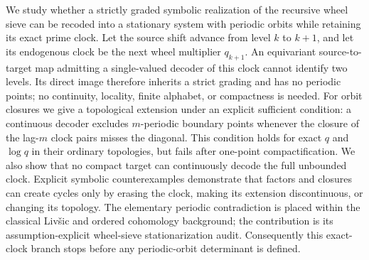 We study whether a strictly graded symbolic realization of the recursive
wheel sieve can be recoded into a stationary system with periodic orbits
while retaining its exact prime clock.  Let the source shift advance from
level $k$ to $k+1$, and let its endogenous clock be the next wheel multiplier
$q_{k+1}$.  An equivariant source-to-target map admitting a single-valued
decoder of this clock cannot identify two levels.  Its direct image therefore
inherits a strict grading and has no periodic points; no continuity,
locality, finite alphabet, or compactness is needed.  For orbit closures we
give a topological extension under an explicit sufficient condition: a
continuous decoder excludes
$m$-periodic boundary points whenever the closure of the lag-$m$ clock pairs
misses the diagonal.  This condition holds for exact $q$ and $\log q$ in
their ordinary topologies, but fails after one-point compactification.  We
also show that no compact target can continuously decode the full unbounded
clock.  Explicit symbolic counterexamples demonstrate that factors and
closures can create cycles only by erasing the clock, making its extension
discontinuous, or changing its topology.  The elementary periodic
contradiction is placed within the classical Liv\v{s}ic and ordered
cohomology background; the contribution is its assumption-explicit
wheel-sieve stationarization audit.  Consequently this exact-clock branch
stops before any periodic-orbit determinant is defined.
